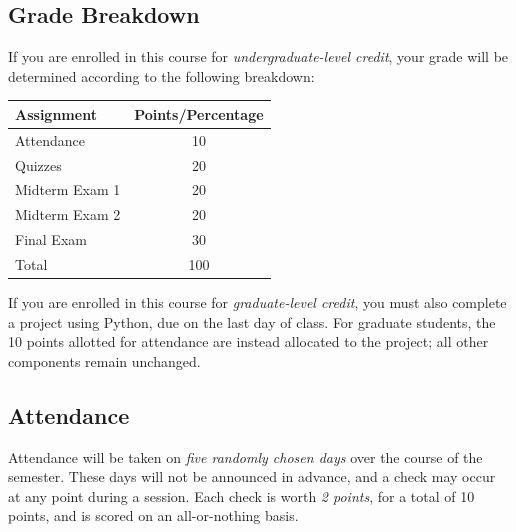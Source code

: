 \documentclass{./../latex/syllabus}
\begin{document}
\subsection*{Grade Breakdown}

\noindent If you are enrolled in this course for \textit{undergraduate-level credit}, your grade will be determined according to the following breakdown:
\begin{center}
\begin{tabularx}{0.65\textwidth}{Xc}
\hline
  \textbf{Assignment}        & \textbf{Points/Percentage} \\ \hline
Attendance & 10 \\
Quizzes & 20 \\
Midterm Exam 1 & 20 \\
Midterm Exam 2 & 20 \\
Final Exam & 30 \\
\hline
Total & 100 \\
\hline
\end{tabularx}
\end{center}

\noindent If you are enrolled in this course for \textit{graduate-level credit}, you must also complete a project using Python, due on the last day of class. For graduate students, the 10 points allotted for attendance are instead allocated to the project; all other components remain unchanged.

\subsection*{Attendance}

Attendance will be taken on \textit{five randomly chosen days} over the course of the semester. These days will not be announced in advance, and a check may occur at any point during a session. Each check is worth \textit{2 points}, for a total of 10 points, and is scored on an all-or-nothing basis.

%
\end{document}
